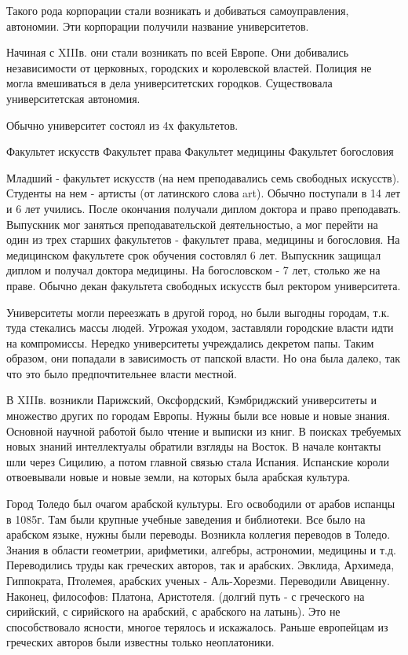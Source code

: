     Такого рода корпорации стали возникать и добиваться самоуправления, автономии. Эти корпорации получили название университетов.

Начиная с XIIIв. они стали возникать по всей Европе. Они добивались независимости от церковных, городских и королевской властей. Полиция не могла вмешиваться в дела университетских городков. Существовала университетская автономия.

Обычно университет состоял из 4х факультетов.

    Факультет искусств
    Факультет права
    Факультет медицины
    Факультет богословия

Младший - факультет искусств (на нем преподавались семь свободных искусств). Студенты на нем - артисты (от латинского слова art). Обычно поступали в 14 лет и 6 лет учились. После окончания получали диплом доктора и право преподавать. Выпускник мог заняться преподавательской деятельностью, а мог перейти на один из трех старших факультетов - факультет права, медицины и богословия. На медицинском факультете срок обучения состовлял 6 лет. Выпускник защищал диплом и получал доктора медицины. На богословском - 7 лет, столько же на праве. Обычно декан факультета свободных искусств был ректором университета.

Университеты могли переезжать в другой город, но были выгодны городам, т.к. туда стекались массы людей. Угрожая уходом, заставляли городские власти идти на компромиссы. Нередко университеты учреждались декретом папы. Таким образом, они попадали в зависимость от папской власти. Но она была далеко, так что это было предпочтительнее власти местной.

В XIIIв. возникли Парижский, Оксфордский, Кэмбриджский университеты и множество других по городам Европы. Нужны были все новые и новые знания. Основной научной работой было чтение и выписки из книг. В поисках требуемых новых знаний интеллектуалы обратили взгляды на Восток. В начале контакты шли через Сицилию, а потом главной связью стала Испания. Испанские короли отвоевывали новые и новые земли, на которых была арабская культура.

Город Толедо был очагом арабской культуры. Его освободили от арабов испанцы в 1085г. Там были крупные учебные заведения и библиотеки. Все было на арабском языке, нужны были переводы. Возникла коллегия переводов в Толедо. Знания в области геометрии, арифметики, алгебры, астрономии, медицины и т.д. Переводились труды как греческих авторов, так и арабских. Эвклида, Архимеда, Гиппократа, Птолемея, арабских ученых - Аль-Хорезми. Переводили Авиценну. Наконец, философов: Платона, Аристотеля. (долгий путь - с греческого на сирийский, с сирийского на арабский, с арабского на латынь). Это не способствовало ясности, многое терялось и искажалось. Раньше европейцам из греческих авторов были известны только неоплатоники.

